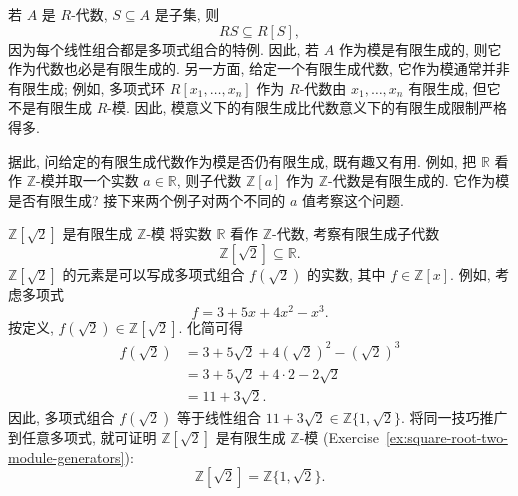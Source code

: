 若 $A$ 是 $R$-代数, $S\subseteq A$ 是子集, 则
\[
  RS\subseteq R[S],
\]
因为每个线性组合都是多项式组合的特例. 因此, 若 $A$ 作为模是有限生成的, 则它作为代数也必是有限生成的. 另一方面, 给定一个有限生成代数, 它作为模通常并非有限生成; 例如, 多项式环 $R[x_{1},\ldots,x_{n}]$ 作为 $R$-代数由 $x_{1},\ldots,x_{n}$ 有限生成, 但它不是有限生成 $R$-模. 因此, 模意义下的有限生成比代数意义下的有限生成限制严格得多.

据此, 问给定的有限生成代数作为模是否仍有限生成, 既有趣又有用. 例如, 把 $\mathbb{R}$ 看作 $\mathbb{Z}$-模并取一个实数 $a\in\mathbb{R}$, 则子代数 $\mathbb{Z}[a]$ 作为 $\mathbb{Z}$-代数是有限生成的. 它作为模是否有限生成? 接下来两个例子对两个不同的 $a$ 值考察这个问题.

\begin{Example}{{\textmd{$\mathbb{Z}[\sqrt{2}]$} 是有限生成 $\mathbb{Z}$-模}}\leavevmode\label{ex:square-root-two-finite-module}
  将实数 $\mathbb{R}$ 看作 $\mathbb{Z}$-代数, 考察有限生成子代数
  \[
    \mathbb{Z}[\sqrt{2}]\subseteq\mathbb{R}.
  \]
  $\mathbb{Z}[\sqrt{2}]$ 的元素是可以写成多项式组合 $f(\sqrt{2})$ 的实数, 其中 $f\in\mathbb{Z}[x]$. 例如, 考虑多项式
  \[
    f=3+5x+4x^{2}-x^{3}.
  \]
  按定义, $f(\sqrt{2})\in\mathbb{Z}[\sqrt{2}]$. 化简可得
  \[
    \begin{aligned}
      f(\sqrt{2})&=3+5\sqrt{2}+4(\sqrt{2})^{2}-(\sqrt{2})^{3}\\
        &=3+5\sqrt{2}+4\cdot2-2\sqrt{2}\\
        &=11+3\sqrt{2}.
    \end{aligned}
  \]
  因此, 多项式组合 $f(\sqrt{2})$ 等于线性组合 $11+3\sqrt{2}\in\mathbb{Z}\{1,\sqrt{2}\}$. 将同一技巧推广到任意多项式, 就可证明 $\mathbb{Z}[\sqrt{2}]$ 是有限生成 $\mathbb{Z}$-模 (Exercise~\ref{ex:square-root-two-module-generators}):
  \[
    \mathbb{Z}[\sqrt{2}]=\mathbb{Z}\{1,\sqrt{2}\}.
  \]
\end{Example}

